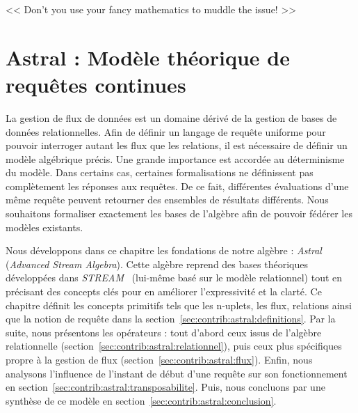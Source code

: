 \begin{savequote}[6cm]
<< Don't you use your fancy mathematics to muddle the issue! >>
\end{savequote}

\chapter{Astral : Modèle théorique de requêtes continues}\label{chap:contrib:astral}
\chaptertoc

La gestion de flux de données est un domaine dérivé de la gestion de bases de données relationnelles. Afin de définir un langage de requête uniforme pour pouvoir interroger autant les flux que les relations, il est nécessaire de définir un modèle algébrique précis. Une grande importance est accordée au déterminisme du modèle. Dans certains cas, certaines formalisations ne définissent pas complètement les réponses aux requêtes. De ce fait, différentes évaluations d'une même requête peuvent retourner des ensembles de résultats différents. Nous souhaitons formaliser exactement les bases de l'algèbre afin de pouvoir fédérer les modèles existants.

Nous développons dans ce chapitre les fondations de notre algèbre : \textit{Astral} (\textit{Advanced Stream Algebra}). Cette algèbre reprend des bases théoriques développées dans \textit{STREAM}~\cite{Arasu:stream} (lui-même basé sur le modèle relationnel) tout en précisant des concepts clés pour en améliorer l'expressivité et la clarté. Ce chapitre définit les concepts primitifs tels que les n-uplets, les flux, relations ainsi que la notion de requête dans la section~\ref{sec:contrib:astral:definitions}. Par la suite, nous présentons les opérateurs : tout d'abord ceux issus de l'algèbre relationnelle (section~\ref{sec:contrib:astral:relationnel}), puis ceux plus spécifiques propre à la gestion de flux (section~\ref{sec:contrib:astral:flux}). Enfin, nous analysons l'influence de l'instant de début d'une requête sur son fonctionnement en section~\ref{sec:contrib:astral:transposabilite}. Puis, nous concluons par une synthèse de ce modèle en section~\ref{sec:contrib:astral:conclusion}.






